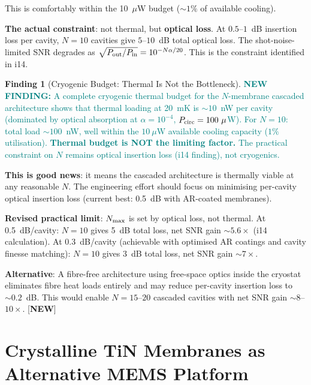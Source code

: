 \documentclass[11pt]{article}
\newcommand{\newfinding}[1]{\textcolor{teal}{\textbf{NEW FINDING:} #1}}
\theoremstyle{definition}
\newtheorem{finding}[theorem]{Finding}
\theoremstyle{remark}
\begin{document}
This is comfortably within the 10~$\mu$W budget ($\sim 1\%$ of
available cooling).

\textbf{The actual constraint}: not thermal, but \textbf{optical
loss}. At $0.5$--$1$~dB insertion loss per cavity, $N = 10$ cavities
give $5$--$10$~dB total optical loss. The shot-noise-limited SNR
degrades as $\sqrt{P_{\rm out}/P_{\rm in}} = 10^{-N\alpha/20}$.
This is the constraint identified in i14.

\begin{finding}[Cryogenic Budget: Thermal Is Not the Bottleneck]
\label{find:cryo}
\newfinding{A complete cryogenic thermal budget for the $N$-membrane
cascaded architecture shows that thermal loading at 20~mK is
$\sim 10$~nW per cavity (dominated by optical absorption at
$\alpha = 10^{-4}$, $P_{\rm circ} = 100~\mu$W). For $N = 10$:
total load $\sim 100$~nW, well within the $10~\mu$W available
cooling capacity ($1\%$ utilisation). \textbf{Thermal budget
is NOT the limiting factor.} The practical constraint on $N$
remains optical insertion loss (i14 finding), not cryogenics.}

\textbf{This is good news}: it means the cascaded architecture
is thermally viable at any reasonable $N$. The engineering effort
should focus on minimising per-cavity optical insertion loss
(current best: 0.5~dB with AR-coated membranes).

\textbf{Revised practical limit}: $N_{\rm max}$ is set by optical
loss, not thermal. At 0.5~dB/cavity: $N = 10$ gives 5~dB total
loss, net SNR gain $\sim 5.6\times$ (i14 calculation). At 0.3~dB/cavity
(achievable with optimised AR coatings and cavity finesse matching):
$N = 10$ gives 3~dB total loss, net SNR gain $\sim 7\times$.

\textbf{Alternative}: A fibre-free architecture using free-space
optics inside the cryostat eliminates fibre heat loads entirely
and may reduce per-cavity insertion loss to $\sim 0.2$~dB. This
would enable $N = 15$--$20$ cascaded cavities with net SNR gain
$\sim 8$--$10\times$.
[\textbf{NEW}]
\end{finding}


\part{Crystalline TiN Membranes as Alternative MEMS Platform}
\label{part:TiN}
\end{document}
